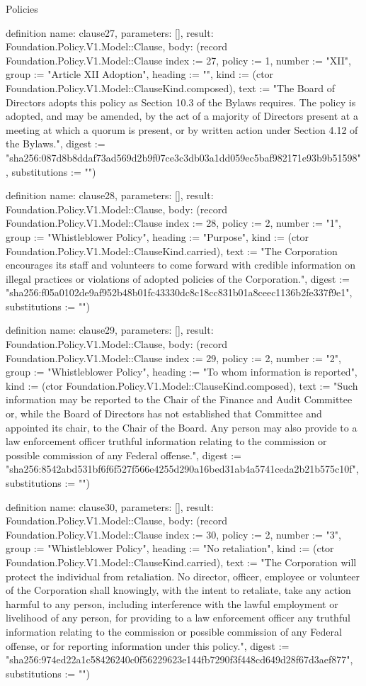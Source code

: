 \begin{lexlean}{Policies}
\begin{semanticmodule}
definition{
  name: clause27,
  parameters: [],
  result: Foundation.Policy.V1.Model::Clause,
  body: (record Foundation.Policy.V1.Model::Clause {index := 27, policy := 1, number := "XII", group := "Article XII Adoption", heading := "", kind := (ctor Foundation.Policy.V1.Model::ClauseKind.composed), text := "The Board of Directors adopts this policy as Section 10.3 of the Bylaws requires. The policy is adopted, and may be amended, by the act of a majority of Directors present at a meeting at which a quorum is present, or by written action under Section 4.12 of the Bylaws.", digest := "sha256:087d8b8ddaf73ad569d2b9f07ce3c3db03a1dd059ec5baf982171e93b9b51598", substitutions := ""})
}

definition{
  name: clause28,
  parameters: [],
  result: Foundation.Policy.V1.Model::Clause,
  body: (record Foundation.Policy.V1.Model::Clause {index := 28, policy := 2, number := "1", group := "Whistleblower Policy", heading := "Purpose", kind := (ctor Foundation.Policy.V1.Model::ClauseKind.carried), text := "The Corporation encourages its staff and volunteers to come forward with credible information on illegal practices or violations of adopted policies of the Corporation.", digest := "sha256:f05a0102de9af952b48b01fc43330dc8c18cc831b01a8ceec1136b2fe337f9e1", substitutions := ""})
}

definition{
  name: clause29,
  parameters: [],
  result: Foundation.Policy.V1.Model::Clause,
  body: (record Foundation.Policy.V1.Model::Clause {index := 29, policy := 2, number := "2", group := "Whistleblower Policy", heading := "To whom information is reported", kind := (ctor Foundation.Policy.V1.Model::ClauseKind.composed), text := "Such information may be reported to the Chair of the Finance and Audit Committee or, while the Board of Directors has not established that Committee and appointed its chair, to the Chair of the Board. Any person may also provide to a law enforcement officer truthful information relating to the commission or possible commission of any Federal offense.", digest := "sha256:8542abd531bf6f6f527f566e4255d290a16bed31ab4a5741ceda2b21b575c10f", substitutions := ""})
}

definition{
  name: clause30,
  parameters: [],
  result: Foundation.Policy.V1.Model::Clause,
  body: (record Foundation.Policy.V1.Model::Clause {index := 30, policy := 2, number := "3", group := "Whistleblower Policy", heading := "No retaliation", kind := (ctor Foundation.Policy.V1.Model::ClauseKind.carried), text := "The Corporation will protect the individual from retaliation. No director, officer, employee or volunteer of the Corporation shall knowingly, with the intent to retaliate, take any action harmful to any person, including interference with the lawful employment or livelihood of any person, for providing to a law enforcement officer any truthful information relating to the commission or possible commission of any Federal offense, or for reporting information under this policy.", digest := "sha256:974ed22a1c58426240c0f56229623e144fb7290f3f448cd649d28f67d3aef877", substitutions := ""})
}


\end{semanticmodule}
\end{lexlean}
